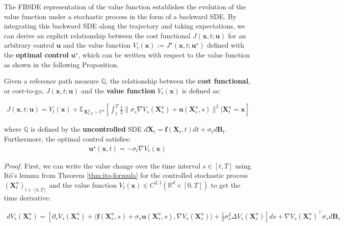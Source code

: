 \documentclass{article}
\newcommand{\boldtext}[1]{\textbf{\textcolor{MyGreen}{#1}}}
\begin{document}
The FBSDE representation of the value function establishes the evolution of the value function under a stochastic process in the form of a backward SDE. By integrating this backward SDE along the trajectory and taking expectations, we can derive an explicit relationship between the cost functional $J(\boldsymbol{x},t;\boldsymbol{u})$ for an arbitrary control $\boldsymbol{u}$ and the value function $V_t(\boldsymbol{x}):=J^\star(\boldsymbol{x},t;\boldsymbol{u}^\star)$ defined with the \boldtext{optimal control} $\boldsymbol{u}^\star$, which can be written with respect to the value function as shown in the following Proposition.

\begin{proposition}\label{prop:optimal-control-and-value-func}
    Given a reference path measure $\mathbb{Q}$, the relationship between the \textbf{cost functional}, or cost-to-go, $J(\boldsymbol{x},t;\boldsymbol{u})$ and the \textbf{value function} $V_t(\boldsymbol{x})$ is defined as:
    \begin{small}
    \begin{align}
        J(\boldsymbol{x},t;\boldsymbol{u})=V_t(\boldsymbol{x})+\mathbb{E}_{\boldsymbol{X}^u_{t:T}\sim \mathbb{P}^u}\left[\int_t^T\frac{1}{2}\|\sigma_s\nabla V_s(\boldsymbol{X}^u_s)+\boldsymbol{u}(\boldsymbol{X}^u_s,s)\|^2\bigg|\boldsymbol{X}^u_t=\boldsymbol{x}\right]\tag{Cost Functional}
    \end{align}
    \end{small}
    where $\mathbb{Q}$ is defined by the \textbf{uncontrolled} SDE $d\boldsymbol{X}_t=\boldsymbol{f}(\boldsymbol{X}_t,t)dt +\sigma_td\boldsymbol{B}_t$. Furthermore, the optimal control satisfies:
    \begin{align}
        \boldsymbol{u}^\star(\boldsymbol{x},t)=-\sigma_t\nabla V_t(\boldsymbol{x})\tag{Optimal Control}\label{eq:optimal-control-value-func}
    \end{align}
\end{proposition}
\textit{Proof.} First, we can write the value change over the time interval $s\in [t,T]$ using Itô's lemma from Theorem \ref{thm:ito-formula} for the controlled stochastic process $(\boldsymbol{X}^u_t)_{t\in [0,T]}$ and the value function $V_t(\boldsymbol{x})\in C^{2,1}(\mathbb{R}^d\times [0,T])$ to get the time derivative:
\begin{small}
\begin{align}
    dV_s(\boldsymbol{X}^u_s)=\left[\partial_sV_s(\boldsymbol{X}^u_s)+\langle \boldsymbol{f}(\boldsymbol{X}^u_s,s)+\sigma_s\boldsymbol{u}(\boldsymbol{X}^u_s,s), \nabla V_s(\boldsymbol{X}^u_s)\rangle +\frac{1}{2}\sigma_s^2\Delta V_s(\boldsymbol{X}^u_s)\right]ds + \nabla V_s(\boldsymbol{X}^u_s)^\top \sigma_s d\boldsymbol{B}_s\label{eq:value-func-ito}
\end{align}
\end{small}
\end{document}
